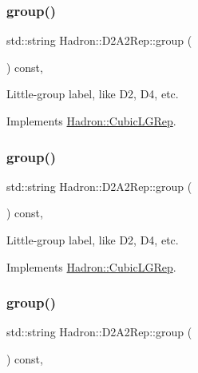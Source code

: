 \subsubsection{\texorpdfstring{group()}{group()}\hspace{0.1cm}{\footnotesize\ttfamily [3/5]}}
{\footnotesize\ttfamily std\+::string Hadron\+::\+D2\+A2\+Rep\+::group (\begin{DoxyParamCaption}{ }\end{DoxyParamCaption}) const\hspace{0.3cm}{\ttfamily [inline]}, {\ttfamily [virtual]}}

Little-\/group label, like D2, D4, etc. 

Implements \mbox{\hyperlink{structHadron_1_1CubicLGRep_a9bdb14b519a611d21379ed96a3a9eb41}{Hadron\+::\+Cubic\+L\+G\+Rep}}.

\mbox{\label{structHadron_1_1D2A2Rep_a8e9ca89445c95fe1a83b73d4eeddf68b}} 
\subsubsection{\texorpdfstring{group()}{group()}\hspace{0.1cm}{\footnotesize\ttfamily [4/5]}}
{\footnotesize\ttfamily std\+::string Hadron\+::\+D2\+A2\+Rep\+::group (\begin{DoxyParamCaption}{ }\end{DoxyParamCaption}) const\hspace{0.3cm}{\ttfamily [inline]}, {\ttfamily [virtual]}}

Little-\/group label, like D2, D4, etc. 

Implements \mbox{\hyperlink{structHadron_1_1CubicLGRep_a9bdb14b519a611d21379ed96a3a9eb41}{Hadron\+::\+Cubic\+L\+G\+Rep}}.

\mbox{\label{structHadron_1_1D2A2Rep_a8e9ca89445c95fe1a83b73d4eeddf68b}} 
\subsubsection{\texorpdfstring{group()}{group()}\hspace{0.1cm}{\footnotesize\ttfamily [5/5]}}
{\footnotesize\ttfamily std\+::string Hadron\+::\+D2\+A2\+Rep\+::group (\begin{DoxyParamCaption}{ }\end{DoxyParamCaption}) const\hspace{0.3cm}{\ttfamily [inline]}, {\ttfamily [virtual]}}

